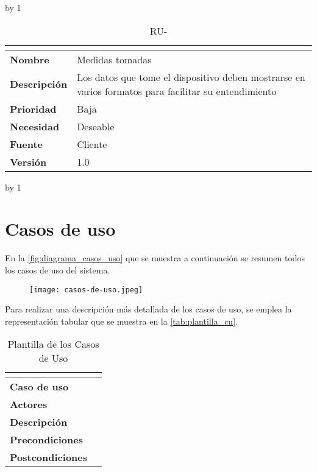 \advance\ru by 1
\begin{table}[H]
	\caption{RU-\number\ru}
	\begin{tabular}{|l|p{}|}
		\hline
		\multicolumn{2}{|c|}{\cellcolor[HTML]{BFBFBF}{\color[HTML]{000000} \textbf{RU-\number\ru}}} \\ \hline
		\textbf{Nombre}      & Medidas tomadas                                                                                      \\ \hline
		\textbf{Descripción} & Los datos que tome el dispositivo deben mostrarse en varios formatos para facilitar su entendimiento \\ \hline
		\textbf{Prioridad}   & Baja                                                                                                 \\ \hline
		\textbf{Necesidad}   & Deseable                                                                                             \\ \hline
		\textbf{Fuente}      & Cliente                                                                                              \\ \hline
		\textbf{Versión}     & 1.0                                                                                                  \\ \hline
	\end{tabular}
\end{table}
\advance\ru by 1
\pagebreak

\section{Casos de uso}\label{sec:casos-de-uso}
En la \autoref{fig:diagrama_casos_uso} que se muestra a continuación se resumen todos los casos de uso del sistema.

\begin{figure}[H]
	{\texttt{[image: casos-de-uso.jpeg]}}
\end{figure}

Para realizar una descripción más detallada de los casos de uso, se emplea la representación tabular que se muestra en la \autoref{tab:plantilla_cu}.
\begin{table}[H]
	\centering
	\caption{Plantilla de los Casos de Uso}
	\label{tab:plantilla_cu}
	\begin{tabular}{|l|p{}|}
		\hline
		\multicolumn{2}{|c|}{\cellcolor[HTML]{BFBFBF}{\color[HTML]{000000} \textbf{CU-XX}}} \\ \hline
		\textbf{Caso de uso}     &   \\ \hline
		\textbf{Actores}         &   \\ \hline
		\textbf{Descripción}     &   \\ \hline
		\textbf{Precondiciones}  &   \\ \hline
		\textbf{Postcondiciones} &   \\ \hline
	\end{tabular}
\end{table}

